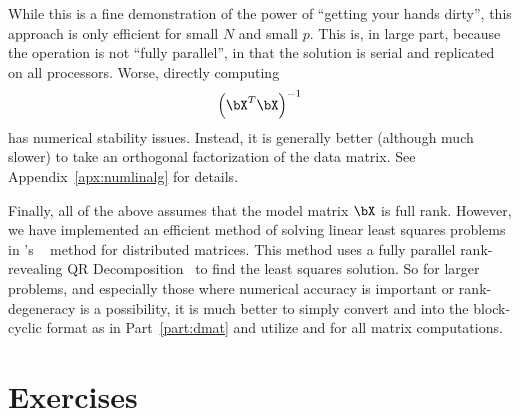 While this is a fine demonstration of the power of
``getting your hands dirty'', this approach is only efficient for
small $N$ and small $p$. This is, in large part, because the operation
is not ``fully parallel'', in that the solution is serial and replicated
on all processors. Worse, directly computing
\begin{align*}
\left(\bX^T\bX\right)^{-1}
\end{align*}
has numerical stability issues. Instead, it is generally better
(although much slower) to take an orthogonal factorization of the data matrix.
See Appendix~\ref{apx:numlinalg} for details.

Finally, all of the above assumes that the model matrix $\bX$ is full rank.
However, we have implemented an efficient method of solving linear least
squares problems in 's
~
method for distributed matrices. This method uses a fully parallel
rank-revealing QR Decomposition~
to find the least squares solution. So for larger problems, and especially
those where numerical accuracy is important or rank-degeneracy is
a possibility, it is much better to simply convert
 and 
into the block-cyclic format as
in Part~\ref{part:dmat} and utilize  and 
for all matrix computations.





\section{Exercises}
\label{sec:statistics_exercise}

